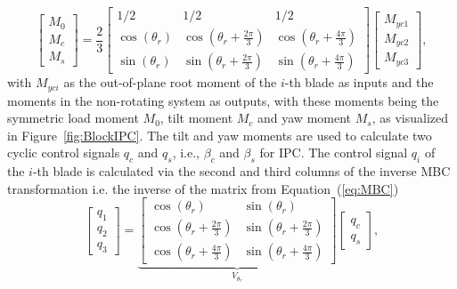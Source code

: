 \begin{equation} \label{eq:MBC}
    \left[ \begin{array}{c}
        M_0\\
        M_c\\
        M_s
    \end{array} \right] = \frac{2}{3}
    \left[ \begin{array}{ccc}
        1/2 & 1/2 & 1/2\\
        \cos(\theta_{r}) & \cos(\theta_{r} + \frac{2\pi}{3}) & \cos(\theta_{r} + \frac{4\pi}{3})\\
        \sin(\theta_{r}) & \sin(\theta_{r} + \frac{2\pi}{3}) & \sin(\theta_{r} + \frac{4\pi}{3})
    \end{array} \right]
    \left[ \begin{array}{c}
        M_{yc1}\\
        M_{yc2}\\
        M_{yc3}
    \end{array} \right], 
\end{equation}
with  $M_{yci}$ as the out-of-plane root moment of the $i$-th blade as inputs and the moments in the non-rotating system as outputs, with these moments being the symmetric load moment $M_0$, tilt moment $M_c$ and yaw moment $M_s$, as visualized in Figure~\ref{fig:BlockIPC}. The tilt and yaw moments are used to calculate two cyclic control signals $q_c$ and $q_s$, i.e., $\beta_c$ and $\beta_s$ for IPC. 
The control signal $q_i$ of the $i$-th blade is calculated via the second and third columns of the inverse MBC transformation i.e. the inverse of the matrix from Equation~(\ref{eq:MBC}) %
\begin{equation} \label{eq:inverseMBC}
    \left[ \begin{array}{c}
        q_1\\
        q_2\\
        q_3
    \end{array} \right] = 
    \underbrace{\left[ \begin{array}{ccc}
            \cos(\theta_{r}) &  \sin(\theta_{r})\\
            \cos(\theta_{r} + \frac{2\pi}{3}) &  \sin(\theta_{r} + \frac{2\pi}{3})\\
            \cos(\theta_{r} + \frac{4\pi}{3}) &  \sin(\theta_{r} + \frac{4\pi}{3})
        \end{array} \right]}_{V_{\theta_{r}}}
    \left[ \begin{array}{c}
        q_c\\
        q_s
    \end{array} \right],
\end{equation}
